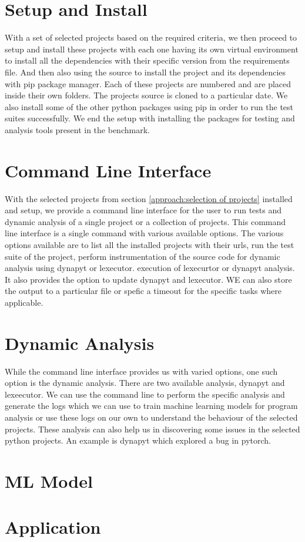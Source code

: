 \section{Setup and Install}
\label{approach:setup and install}
With a set of selected projects based on the required criteria, we then proceed to setup and install these projects with each one having its own virtual environment to install all the dependencies with their specific version from the requirements file. And then also using the source to install the project and its dependencies with pip package manager. Each of these projects are numbered and are placed inside their own folders. The projects source is cloned to a particular date. We also install some of the other python packages using pip in order to run the test suites successfully. We end the setup with installing the packages for testing and analysis tools present in the benchmark.

\section{Command Line Interface}
\label{approach:command line interface}
With the selected projects from section \ref{approach:selection of projects} installed and setup, we provide a command line interface for the user to run tests and dynamic analysis of a single project or a collection of projects. This command line interface is a single command with various available options. The various options available are to list all the installed projects with their urls, run the test suite of the project, perform instrumentation of the source code for dynamic analysis using dynapyt or lexecutor. execution of lexecurtor or dynapyt analysis. It also provides the option to update dynapyt and lexecutor. WE can also store the output to a particular file or spefic a timeout for the specific tasks where applicable. 

\section{Dynamic Analysis}
\label{approach:dynamic analysis}
While the command line interface provides us with varied options, one such option is the dynamic analysis. There are two available analysis, dynapyt and lexeecutor. We can use the command line to perform the specific analysis and generate the logs which we can use to train machine learning models for program analysis or use these logs on our own to understand the behaviour of the selected projects. These analysis can also help us in discovering some issues in the selected python projects. An example is dynapyt which explored a bug in pytorch. 

\section{ML Model}
\label{approach:ml model}

\section{Application}
\label{approach:application}